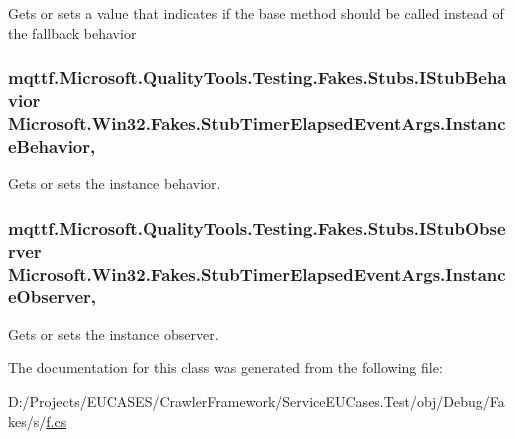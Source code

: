 Gets or sets a value that indicates if the base method should be called instead of the fallback behavior

\hypertarget{class_microsoft_1_1_win32_1_1_fakes_1_1_stub_timer_elapsed_event_args_ae4386b45f9a89434284bad326dcdbf50}{
\subsubsection[{Instance\-Behavior}]{\setlength{\rightskip}{0pt plus 5cm}mqttf.\-Microsoft.\-Quality\-Tools.\-Testing.\-Fakes.\-Stubs.\-I\-Stub\-Behavior Microsoft.\-Win32.\-Fakes.\-Stub\-Timer\-Elapsed\-Event\-Args.\-Instance\-Behavior\hspace{0.3cm}{\ttfamily [get]}, {\ttfamily [set]}}}\label{class_microsoft_1_1_win32_1_1_fakes_1_1_stub_timer_elapsed_event_args_ae4386b45f9a89434284bad326dcdbf50}


Gets or sets the instance behavior.

\hypertarget{class_microsoft_1_1_win32_1_1_fakes_1_1_stub_timer_elapsed_event_args_a0bd03e41b59b9d9fddce390a746bd5c5}{
\subsubsection[{Instance\-Observer}]{\setlength{\rightskip}{0pt plus 5cm}mqttf.\-Microsoft.\-Quality\-Tools.\-Testing.\-Fakes.\-Stubs.\-I\-Stub\-Observer Microsoft.\-Win32.\-Fakes.\-Stub\-Timer\-Elapsed\-Event\-Args.\-Instance\-Observer\hspace{0.3cm}{\ttfamily [get]}, {\ttfamily [set]}}}\label{class_microsoft_1_1_win32_1_1_fakes_1_1_stub_timer_elapsed_event_args_a0bd03e41b59b9d9fddce390a746bd5c5}


Gets or sets the instance observer.



The documentation for this class was generated from the following file\-:\begin{DoxyCompactItemize}
\item 
D\-:/\-Projects/\-E\-U\-C\-A\-S\-E\-S/\-Crawler\-Framework/\-Service\-E\-U\-Cases.\-Test/obj/\-Debug/\-Fakes/s/\hyperlink{s_2f_8cs}{f.\-cs}\end{DoxyCompactItemize}
